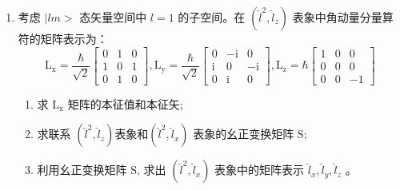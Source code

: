 \begin{enumerate}
\item 
考虑 $\mid lm>$ 态矢量空间中 $l=1$ 的子空间。在 $\left(\hat{l}^{2}, \hat{l}_{z}\right)$ 表象中角动量分量算符的矩阵表示为：
$$
\mathrm{L}_{\mathrm{x}}=\frac{\hbar}{\sqrt{2}}\left[\begin{array}{lll}
	0 & 1 & 0 \\
	1 & 0 & 1 \\
	0 & 1 & 0
\end{array}\right], \mathrm{L}_{\mathrm{y}}=\frac{\hbar}{\sqrt{2}}\left[\begin{array}{ccc}
	0 & -\mathrm{i} & 0 \\
	\mathrm{i} & 0 & -\mathrm{i} \\
	0 & \mathrm{i} & 0
\end{array}\right], \mathrm{L}_{\mathrm{z}}=\hbar\left[\begin{array}{ccc}
	1 & 0 & 0 \\
	0 & 0 & 0 \\
	0 & 0 & -1
\end{array}\right]
$$
\begin{enumerate}
	\item
	求 $\mathrm{L}_{\mathrm{x}}$ 矩阵的本征值和本征矢;
	\item 
	求联系 $\left(\hat{l}^{2}, \hat{l}_{z}\right)$表象和$\left(\hat{l}^{2}, \hat{l}_{x}\right)$ 表象的幺正变换矩阵 $\mathrm{S}$;
	\item 
	利用幺正变换矩阵 $\mathrm{S}$, 求出 $\left(\hat{l}^{2}, \hat{l}_{x}\right)$ 表象中的矩阵表示 $\hat{l}_{x}, \hat{l}_{y}, \hat{l}_{z}$ 。
	
	
	
\end{enumerate}
\end{enumerate}
